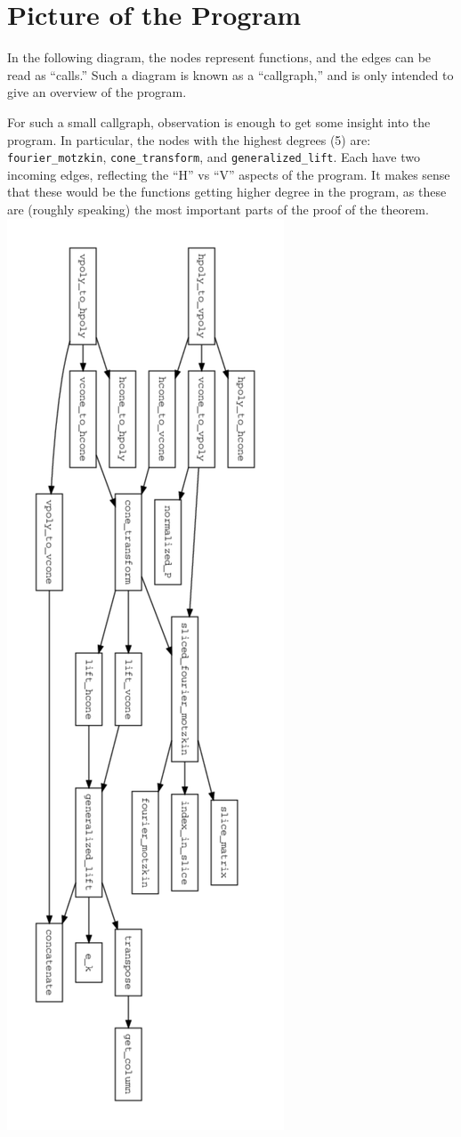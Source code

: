\section{Picture of the Program}
In the following diagram, the nodes represent functions, and the edges can be read as ``calls.''  Such a diagram is known as a ``callgraph,'' and is only intended to give an overview of the program.

For such a small callgraph, observation is enough to get some insight into the program.  In particular, the nodes with the highest degrees (5) are: \\
\texttt{fourier\_motzkin}, \texttt{cone\_transform}, and \texttt{generalized\_lift}.  Each have two incoming edges, reflecting the ``H'' vs ``V'' aspects of the program.  It makes sense that these would be the functions getting higher degree in the program, as these are (roughly speaking) the most important parts of the proof of the theorem.
\includegraphics[keepaspectratio,width=\textwidth,height=\textheight,interpolate=false]{../img/callgraph.pdf}

